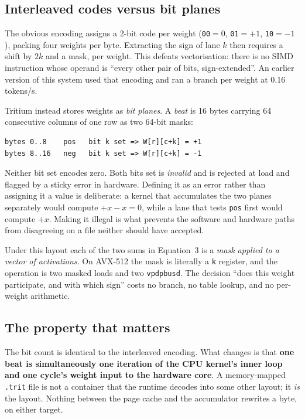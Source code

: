 \documentclass[10pt,twocolumn]{article}
\begin{document}
\subsection{Interleaved codes versus bit planes}

The obvious encoding assigns a 2-bit code per weight (\texttt{00}$=0$,
\texttt{01}$=+1$, \texttt{10}$=-1$), packing four weights per byte. Extracting
the sign of lane $k$ then requires a shift by $2k$ and a mask, per weight. This
defeats vectorisation: there is no SIMD instruction whose operand is
``every other pair of bits, sign-extended''. An earlier version of this system
used that encoding and ran a branch per weight at 0.16 tokens/s.

Tritium instead stores weights as \emph{bit planes}. A \emph{beat} is 16 bytes
carrying 64 consecutive columns of one row as two 64-bit masks:

\begin{lstlisting}
bytes 0..8    pos   bit k set => W[r][c+k] = +1
bytes 8..16   neg   bit k set => W[r][c+k] = -1
\end{lstlisting}

Neither bit set encodes zero. Both bits set is \emph{invalid} and is rejected at
load and flagged by a sticky error in hardware. Defining it as an error rather
than assigning it a value is deliberate: a kernel that accumulates the two
planes separately would compute $+x-x=0$, while a lane that tests \texttt{pos}
first would compute $+x$. Making it illegal is what prevents the software and
hardware paths from disagreeing on a file neither should have accepted.

Under this layout each of the two sums in Equation~3 is a \emph{mask applied to
a vector of activations}. On AVX-512 the mask is literally a \texttt{k}
register, and the operation is two masked loads and two \texttt{vpdpbusd}. The
decision ``does this weight participate, and with which sign'' costs no branch,
no table lookup, and no per-weight arithmetic.

\subsection{The property that matters}

The bit count is identical to the interleaved encoding. What changes is that
\textbf{one beat is simultaneously one iteration of the CPU kernel's inner loop
and one cycle's weight input to the hardware core}. A memory-mapped
\texttt{.trit} file is not a container that the runtime decodes into some other
layout; it \emph{is} the layout. Nothing between the page cache and the
accumulator rewrites a byte, on either target.
\end{document}
